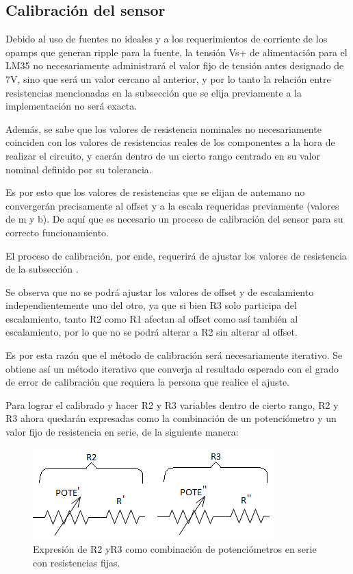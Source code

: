 \documentclass[../../main.tex]{subfiles}
\begin{document}
\subsection{Calibración del sensor}
\label{Calibration}
Debido al uso de fuentes no ideales y a los requerimientos de corriente de los opamps que generan ripple para la fuente, la tensión Vs+ de alimentación para el LM35 no necesariamente administrará el valor fijo de tensión antes designado de 7V, sino que será un valor cercano al anterior, y por lo tanto la relación entre resistencias mencionadas en la subsección  que se elija previamente a la implementación no será exacta. \par
Además, se sabe que los valores de resistencia nominales no necesariamente coinciden con los valores de resistencias reales de los componentes a la hora de realizar el circuito, y caerán dentro de un cierto rango centrado en su valor nominal definido por su tolerancia. \par
Es por esto que los valores de resistencias que se elijan de antemano no convergerán precisamente al offset y a la escala requeridas previamente (valores de m y b). De aquí que es necesario un proceso de calibración del sensor para su correcto funcionamiento.\par
El proceso de calibración, por ende, requerirá de ajustar los valores de resistencia de la subsección . \par
Se observa que no se podrá ajustar los valores de offset y de escalamiento independientemente uno del otro, ya que si bien R3 solo participa del escalamiento, tanto R2 como R1 afectan al offset como así también al escalamiento, por lo que no se podrá alterar a R2 sin alterar al offset.\par
Es por esta razón que el método de calibración será necesariamente iterativo. Se obtiene así un método iterativo que converja al resultado esperado con el grado de error de calibración que requiera la persona que realice el ajuste. \par
Para lograr el calibrado y hacer R2 y R3 variables dentro de cierto rango, R2 y R3 ahora quedarán expresadas como la combinación de un potenciómetro y un valor fijo de resistencia en serie, de la siguiente manera:

\begin{figure}[H]	%
	\centering
	\includegraphics[scale=2]{imagenes/nueva_disposicion_rs.png}
	\caption{Expresión de R2 yR3 como combinación de potenciómetros en serie con resistencias fijas.}
	\label{fig:ej6_nueva_disposicion_rs}
\end{figure}
\end{document}
